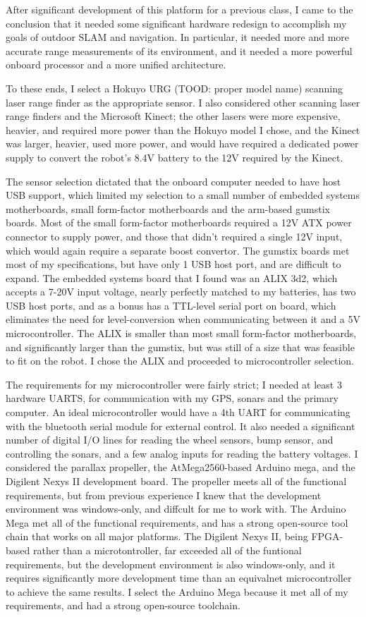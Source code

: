 
After significant development of this platform for a previous class, I came to the conclusion that it needed some significant hardware redesign to accomplish my goals of outdoor SLAM and navigation. In particular, it needed more and more accurate range measurements of its environment, and it needed a more powerful onboard processor and a more unified architecture.

To these ends, I select a Hokuyo URG (TOOD: proper model name) scanning laser range finder as the appropriate sensor. I also considered other scanning laser range finders and the Microsoft Kinect; the other lasers were more expensive, heavier, and required more power than the Hokuyo model I chose, and the Kinect was larger, heavier, used more power, and would have required a dedicated power supply to convert the robot's 8.4V battery to the 12V required by the Kinect.

The sensor selection dictated that the onboard computer needed to have host USB support, which limited my selection to a small number of embedded systems motherboards, small form-factor motherboards and the arm-based gumstix boards. Most of the small form-factor motherboards required a 12V ATX power connector to supply power, and those that didn't required a single 12V input, which would again require a separate boost convertor. The gumstix boards met most of my specifications, but have only 1 USB host port, and are difficult to expand. The embedded systems board that I found was an ALIX 3d2, which accepts a 7-20V input voltage, nearly perfectly matched to my batteries, has two USB host ports, and as a bonus has a TTL-level serial port on board, which eliminates the need for level-conversion when communicating between it and a 5V microcontroller. The ALIX is smaller than most small form-factor motherboards, and significantly larger than the gumstix, but was still of a size that was feasible to fit on the robot. I chose the ALIX and proceeded to microcontroller selection.

The requirements for my microcontroller were fairly strict; I needed at least 3 hardware UARTS, for communication with my GPS, sonars and the primary computer. An ideal microcontroller would have a 4th UART for communicating with the bluetooth serial module for external control. It also needed a significant number of digital I/O lines for reading the wheel sensors, bump sensor, and controlling the sonars, and a few analog inputs for reading the battery voltages. I considered the parallax propeller, the AtMega2560-based Arduino mega, and the Digilent Nexys II development board. The propeller meets all of the functional requirements, but from previous experience I knew that the development environment was windows-only, and diffcult for me to work with. The Arduino Mega met all of the functional requirements, and has a strong open-source tool chain that works on all major platforms. The Digilent Nexys II, being FPGA-based rather than a microtontroller, far exceeded all of the funtional requirements, but the development environment is also windows-only, and it requires significantly more development time than an equivalnet microcontroller to achieve the same results. I select the Arduino Mega because it met all of my requirements, and had a strong open-source toolchain.

